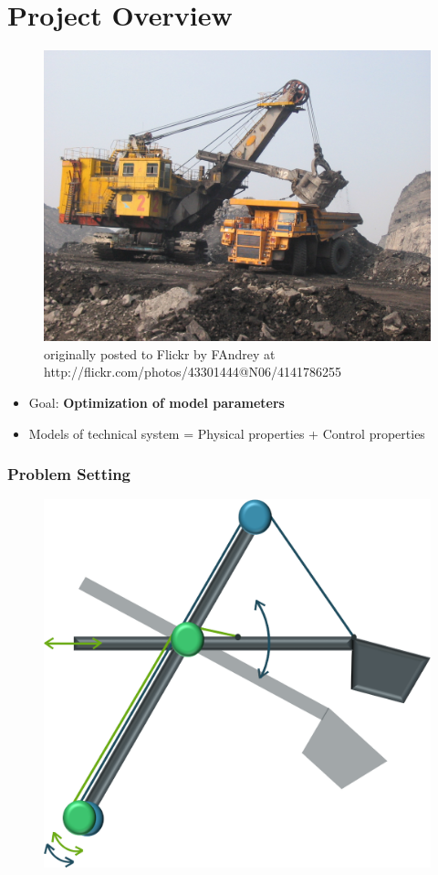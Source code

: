\section{Project Overview}

\begin{frame}
	\begin{figure}[t]
		\centering
		\includegraphics[width=.6\linewidth]{img/Excavator} \\
		\tiny{originally posted to Flickr by FAndrey at http://flickr.com/photos/43301444@N06/4141786255}
	\end{figure}

	\begin{itemize}
		\item{Goal: \textbf{Optimization of model parameters}}
		\item{Models of technical system = Physical properties + Control properties}
	\end{itemize}
\end{frame}

\begin{frame}
	\frametitle{Problem Setting}
	\begin{figure}[bth]
		\centering
		\includegraphics[width=.5\linewidth]{img/Problem_1}
	\end{figure}
\end{frame}

